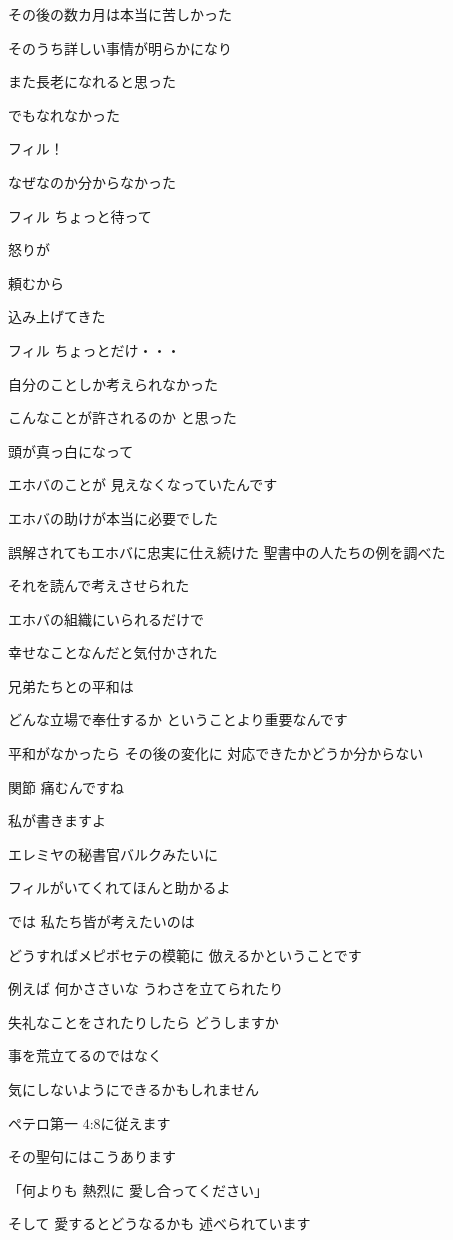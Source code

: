 \documentclass[twocolumn]{jsarticle}
\begin{document}
その後の数カ月は本当に苦しかった

そのうち詳しい事情が明らかになり

また長老になれると思った

でもなれなかった

フィル！

なぜなのか分からなかった

フィル ちょっと待って

怒りが

頼むから

込み上げてきた

フィル ちょっとだけ・・・

自分のことしか考えられなかった

こんなことが許されるのか と思った

頭が真っ白になって

エホバのことが
見えなくなっていたんです

エホバの助けが本当に必要でした

誤解されてもエホバに忠実に仕え続けた
聖書中の人たちの例を調べた

それを読んで考えさせられた

エホバの組織にいられるだけで

幸せなことなんだと気付かされた

兄弟たちとの平和は

どんな立場で奉仕するか
ということより重要なんです

平和がなかったら その後の変化に
対応できたかどうか分からない

関節 痛むんですね

私が書きますよ

エレミヤの秘書官バルクみたいに

フィルがいてくれてほんと助かるよ

では 私たち皆が考えたいのは

どうすればメピボセテの模範に
倣えるかということです

例えば 何かささいな
うわさを立てられたり

失礼なことをされたりしたら
どうしますか

事を荒立てるのではなく 

気にしないようにできるかもしれません

ペテロ第一 4:8に従えます

その聖句にはこうあります

「何よりも 熱烈に
愛し合ってください」

そして 愛するとどうなるかも
述べられています
\end{document}
